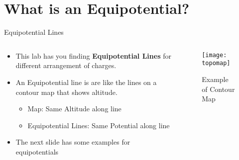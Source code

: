 \documentclass{beamer}
\begin{document}
\section{What is an Equipotential?}
\begin{frame}{Equipotential Lines}
  \begin{columns}
    \begin{column}{0.5\textwidth}
      \begin{itemize}
      \item This lab has you finding \textbf{Equipotential Lines} for different arrangement of charges. 
      \item An Equipotential line is are like the lines on a contour map that shows altitude.
        \begin{itemize}
        \item Map: Same Altitude along line
        \item Equipotential Lines: Same Potential along line
        \end{itemize}
      \item The next slide has some examples for equipotentials
      \end{itemize}
    \end{column}
    \begin{column}{0.5\textwidth}
      \begin{figure}[H]
        \centering
        \texttt{[image: topomap]}
        \caption{Example of Contour Map}
      \end{figure}
    \end{column}
  \end{columns}
\end{frame}
\end{document}
